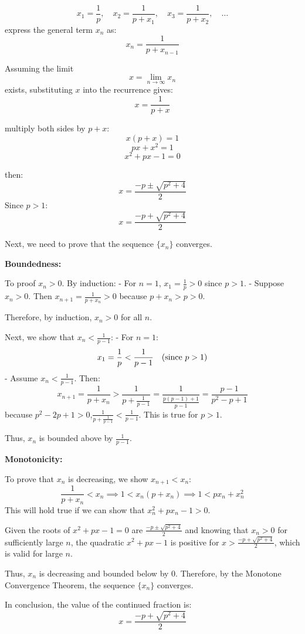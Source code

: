 \documentclass[a4paper]{article}
\begin{document}
\[x_1 = \frac{1}{p}, \quad x_2 = \frac{1}{p + x_1}, \quad x_3 = \frac{1}{p + x_2}, \quad \ldots\]
express the general term \( x_n \) as:
\[x_n = \frac{1}{p + x_{n-1}}\]

Assuming the limit \[x = \lim_{n \to \infty} x_n\]exists, substituting \( x \) into the recurrence gives:
\[x = \frac{1}{p + x}\]

multiply both sides by \( p + x \):
\[x(p + x) = 1\]
\[px + x^2 = 1\]
\[x^2 + px - 1 = 0\]

then:
\[x = \frac{-p \pm \sqrt{p^2 + 4}}{2}\]
Since \( p > 1 \):
\[x = \frac{-p + \sqrt{p^2 + 4}}{2}\]

Next, we need to prove that the sequence \( \{x_n\} \) converges.

\textbf{Boundedness:}

To proof \( x_n > 0 \). By induction:
- For \( n = 1 \), \( x_1 = \frac{1}{p} > 0 \) since \( p > 1 \).
- Suppose \( x_n > 0 \). Then \( x_{n+1} = \frac{1}{p + x_n} > 0 \) because \( p + x_n > p > 0 \).

Therefore, by induction, \( x_n > 0 \) for all \( n \).

Next, we show that \( x_n < \frac{1}{p - 1} \):
- For \( n = 1 \):
\[x_1 = \frac{1}{p} < \frac{1}{p - 1} \quad \text{(since \( p > 1 \))}\]
- Assume \( x_n < \frac{1}{p - 1} \). Then:
\[x_{n+1} = \frac{1}{p + x_n} > \frac{1}{p + \frac{1}{p - 1}} = \frac{1}{\frac{p(p - 1) + 1}{p - 1}} = \frac{p - 1}{p^2 - p + 1}
\]
because \( p^2 - 2p + 1 > 0 \),\( \frac{1}{p + \frac{1}{p - 1}} < \frac{1}{p - 1} \). This is true for \( p > 1 \).

Thus, \( x_n \) is bounded above by \( \frac{1}{p - 1} \).

\textbf{Monotonicity:}

To prove that \( x_n \) is decreasing, we show \( x_{n+1} < x_n \):
\[\frac{1}{p + x_n} < x_n \implies 1 < x_n(p + x_n) \implies 1 < px_n + x_n^2\]This will hold true if we can show that \( x_n^2 + px_n - 1 > 0 \).

Given the roots of \( x^2 + px - 1 = 0 \) are \( \frac{-p \pm \sqrt{p^2 + 4}}{2} \) and knowing that \( x_n > 0 \) for sufficiently large \( n \), the quadratic \( x^2 + px - 1 \) is positive for \( x > \frac{-p + \sqrt{p^2 + 4}}{2} \), which is valid for large \( n \).

Thus, \( x_n \) is decreasing and bounded below by \( 0 \). Therefore, by the Monotone Convergence Theorem, the sequence \( \{x_n\} \) converges.

In conclusion, the value of the continued fraction is:
\[x = \frac{-p + \sqrt{p^2 + 4}}{2}\]
\end{document}

